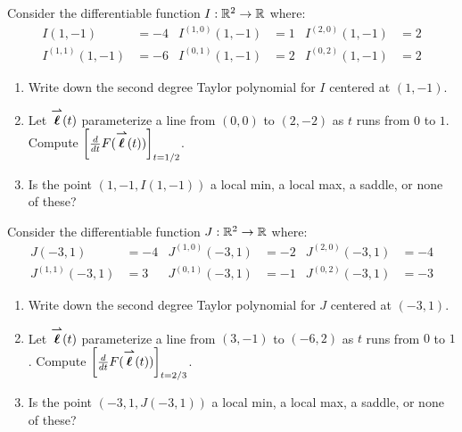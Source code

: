 \documentclass[handout,noauthor,nooutcomes]{ximera}
\begin{document}
\begin{problem} 
Consider the differentiable function $I:\mathbb R^2\to\mathbb R$ where:
\begin{align*}
  I(1,-1) &= -4       &  I^{(1,0)}(1,-1) &= 1 & I^{(2,0)}(1,-1) &= 2\\
  I^{(1,1)}(1,-1) &=-6 &  I^{(0,1)}(1,-1) &= 2 & I^{(0,2)}(1,-1) &= 2  
\end{align*}
\begin{enumerate}
\item Write down the second degree Taylor polynomial for $I$ centered at $(1,-1)$.
  \item Let ${\overset{\boldsymbol{\rightharpoonup}}{\mathbf{\boldsymbol{\ell}}}}(t)$ parameterize a line from $(0,0)$ to $(2,-2)$ as
  $t$ runs from $0$ to $1$. Compute $\bigg[ \frac{\mathop{}\!d }{\mathop{}\!d t} F
  ({\overset{\boldsymbol{\rightharpoonup}}{\mathbf{\boldsymbol{\ell}}}}(t)) \bigg]_{t=1/2}$.
\item Is the point $(1,-1,I(1,-1))$ a local min, a local max, a saddle,
  or none of these?
\end{enumerate}
\end{problem}


\begin{problem} 
Consider the differentiable function $J:\mathbb R^2\to\mathbb R$ where:
\begin{align*}
  J(-3,1) &= -4       &  J^{(1,0)}(-3,1) &= -2 & J^{(2,0)}(-3,1) &= -4\\
  J^{(1,1)}(-3,1) &=3 &  J^{(0,1)}(-3,1) &= -1 & J^{(0,2)}(-3,1) &= -3  
\end{align*}
\begin{enumerate}
\item Write down the second degree Taylor polynomial for $J$ centered at $(-3,1)$.
\item Let ${\overset{\boldsymbol{\rightharpoonup}}{\mathbf{\boldsymbol{\ell}}}}(t)$ parameterize a line from $(3,-1)$ to $(-6,2)$ as
  $t$ runs from $0$ to $1$. Compute $\bigg[ \frac{\mathop{}\!d }{\mathop{}\!d t} F({\overset{\boldsymbol{\rightharpoonup}}{\mathbf{\boldsymbol{\ell}}}}(t)) \bigg]_{t=2/3}$.
\item Is the point $(-3,1,J(-3,1))$ a local min, a local max, a saddle,
  or none of these?
\end{enumerate}
\end{problem}
\end{document}

